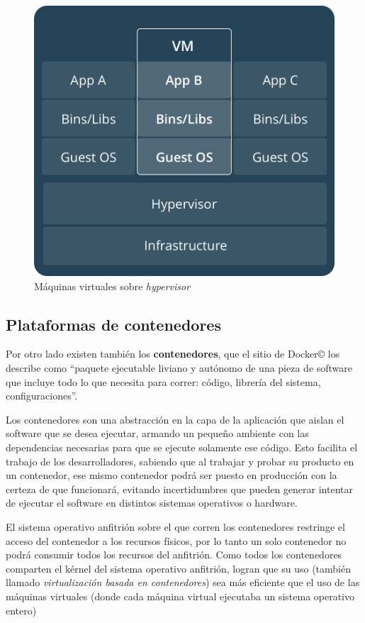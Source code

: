 \documentclass[14pt]{extarticle}
\newcommand{\docker}{Docker\copyright}
\begin{document}
        \begin{figure}
            \includegraphics[scale=0.30]{vms.png}
            \caption{Máquinas virtuales sobre \textit{hypervisor}}
        \end{figure}

        \pagebreak


    \subsection{Plataformas de contenedores}
        Por otro lado existen también los \textbf{contenedores}, que el sitio de \docker{} los describe como ``paquete ejecutable liviano y autónomo de una pieza de software que incluye todo lo que necesita para correr: código, librería del sistema, configuraciones''. 
        
        Los contenedores son una abstracción en la capa de la aplicación que aislan el software que se desea ejecutar, armando un pequeño ambiente con las dependencias necesarias para que se ejecute solamente ese código. Esto facilita el trabajo de los desarrolladores, sabiendo que al trabajar y probar su producto en un contenedor, ese mismo contenedor podrá ser puesto en producción con la certeza de que funcionará, evitando incertidumbres que pueden generar intentar de ejecutar el software en distintos sistemas operativos o hardware.
        
        El sistema operativo anfitrión sobre el que corren los contenedores restringe el acceso del contenedor a los recursos físicos, por lo tanto un solo contenedor no podrá consumir todos los recursos del anfitrión. Como todos los contenedores comparten el kérnel del sistema operativo anfitrión, logran que su uso (también llamado \textit{virtualización basada en contenedores}) sea más eficiente que el uso de las máquinas virtuales (donde cada máquina virtual ejecutaba un sistema operativo entero)\\
\end{document}
